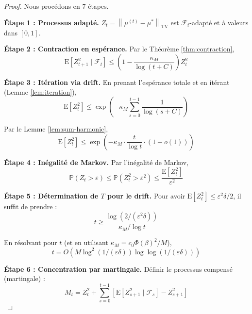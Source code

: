 \documentclass[12pt,a4paper]{article}
\theoremstyle{definition}
\theoremstyle{remark}
\newcommand{\E}{\text{E}}
\newcommand{\Prob}{\mathbb{P}}
\newcommand{\TV}{\text{TV}}
\newcommand{\norm}[1]{\left\|#1\right\|}
\begin{document}
	\begin{proof}
		Nous procédons en 7 étapes.
		
		\textbf{Étape 1 : Processus adapté.}
		$Z_t = \norm{\mu^{(t)} - \mu^*}_{\TV}$ est $\mathcal{F}_t$-adapté et à valeurs dans $[0,1]$.
		
		\textbf{Étape 2 : Contraction en espérance.}
		Par le Théorème \ref{thm:contraction},
		\begin{equation}
			\E[Z_{t+1}^2 \mid \mathcal{F}_t] \leq \left(1 - \frac{\kappa_M}{\log(t+C)}\right) Z_t^2
		\end{equation}
		
		\textbf{Étape 3 : Itération via drift.}
		En prenant l'espérance totale et en itérant (Lemme \ref{lem:iteration}),
		\begin{equation}
			\E[Z_t^2] \leq \exp\left(-\kappa_M \sum_{s=0}^{t-1} \frac{1}{\log(s+C)}\right)
		\end{equation}
		
		Par le Lemme \ref{lem:sum-harmonic},
		\begin{equation}
			\E[Z_t^2] \leq \exp\left(-\kappa_M \cdot \frac{t}{\log t} \cdot (1 + o(1))\right)
		\end{equation}
		
		\textbf{Étape 4 : Inégalité de Markov.}
		Par l'inégalité de Markov,
		\begin{equation}
			\Prob(Z_t > \varepsilon) \leq \Prob(Z_t^2 > \varepsilon^2) \leq \frac{\E[Z_t^2]}{\varepsilon^2}
		\end{equation}
		
		\textbf{Étape 5 : Détermination de $T$ pour le drift.}
		Pour avoir $\E[Z_t^2] \leq \varepsilon^2 \delta / 2$, il suffit de prendre :
		\begin{equation}
			t \geq \frac{\log(2/(\varepsilon^2 \delta))}{\kappa_M / \log t}
		\end{equation}
		
		En résolvant pour $t$ (et en utilisant $\kappa_M = c_0 \Phi(\beta)^2 / M$),
		\begin{equation}
			t = O\left(M \log^2(1/(\varepsilon\delta)) \log\log(1/(\varepsilon\delta))\right)
		\end{equation}
		
		\textbf{Étape 6 : Concentration par martingale.}
		Définir le processus compensé (martingale) :
		\begin{equation}
			M_t = Z_t^2 + \sum_{s=0}^{t-1} [\E[Z_{s+1}^2 \mid \mathcal{F}_s] - Z_{s+1}^2]
		\end{equation}
		

\end{proof}
\end{document}
